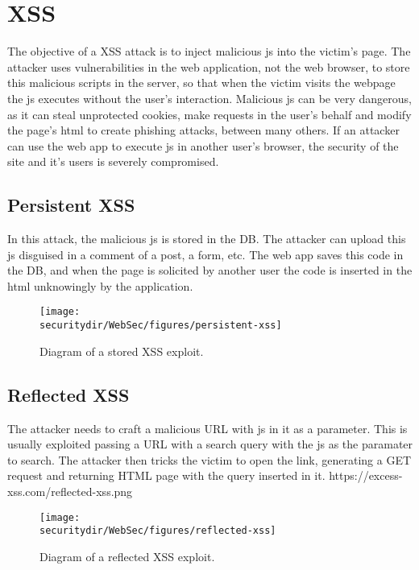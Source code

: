\section{XSS}
The objective of a XSS attack is to inject malicious js into the victim's page. The attacker uses vulnerabilities in the web application, not the web browser, to store this malicious scripts in the server, so that when the victim visits the webpage the js executes without the user's interaction. Malicious js can be very dangerous, as it can steal unprotected cookies, make requests in the user's behalf and modify the page's html to create phishing attacks, between many others. If an attacker can use the web app to execute js in another user's browser, the security of the site and it's users is severely compromised.

\subsection{Persistent XSS}
In this attack, the malicious js is stored in the DB. The attacker can upload this js disguised in a comment of a post, a form, etc. The web app saves this code in the DB, and when the page is solicited by another user the code is inserted in the html unknowingly by the application.
\begin{figure}[htb]
	\begin{centering}
		\texttt{[image: \\securitydir/WebSec/figures/persistent-xss]}
		\par\end{centering}
	\caption{\label{fig:ecb} Diagram of a stored XSS exploit.}
\end{figure}

\subsection{Reflected XSS}
The attacker needs to craft a malicious URL with js in it as a parameter. This is usually exploited passing a URL with a search query with the js as the paramater to search. The attacker then tricks the victim to open the link, generating a GET request and returning HTML page with the query inserted in it. https://excess-xss.com/reflected-xss.png
\begin{figure}[htb]
	\begin{centering}
		\texttt{[image: \\securitydir/WebSec/figures/reflected-xss]}
		\par\end{centering}
	\caption{\label{fig:ecb} Diagram of a reflected XSS exploit.}
\end{figure}

